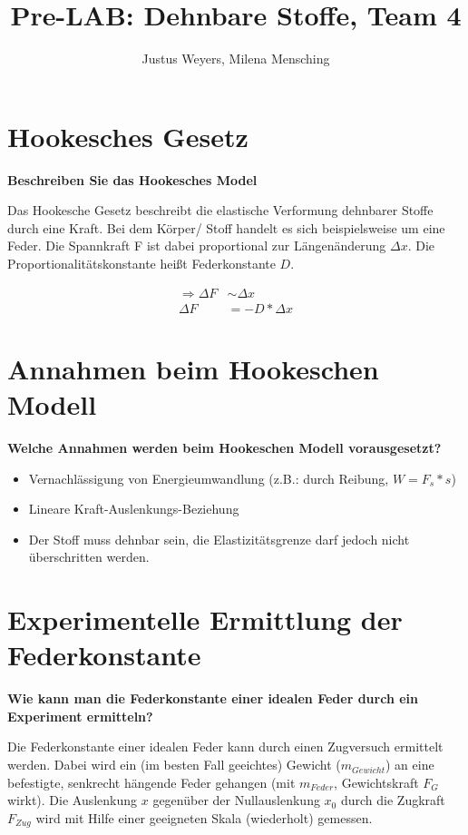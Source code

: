 \documentclass[a4paper, 12pt]{article}
\title{Pre-LAB: Dehnbare Stoffe, Team 4}
\author{Justus Weyers, Milena Mensching}
\begin{document}
\maketitle
\section{Hookesches Gesetz}
\textbf{Beschreiben Sie das Hookesches Model}

Das Hookesche Gesetz beschreibt die elastische Verformung dehnbarer Stoffe durch eine Kraft. Bei dem Körper/ Stoff handelt es sich beispielsweise um eine Feder. Die Spannkraft F ist dabei proportional zur Längenänderung $\Delta x$. Die Proportionalitätskonstante heißt Federkonstante $D$.

\begin{equation}
\begin{split}
\Rightarrow \Delta F&\sim\Delta x\\
\Delta F&= -D*\Delta x
\end{split}
\end{equation}


\section{Annahmen beim Hookeschen Modell}
\textbf{Welche Annahmen werden beim Hookeschen Modell vorausgesetzt?}

\begin{itemize}
\item{Vernachlässigung von Energieumwandlung (z.B.: durch Reibung, $W=F_s*s$)}
\item{Lineare Kraft-Auslenkungs-Beziehung}
\item{Der Stoff muss dehnbar sein, die Elastizitätsgrenze darf jedoch nicht überschritten werden.}
\end{itemize}

\section{Experimentelle Ermittlung der Federkonstante}
\textbf{Wie kann man die Federkonstante einer idealen Feder durch ein Experiment ermitteln?}

Die Federkonstante einer idealen Feder kann durch einen Zugversuch ermittelt werden. Dabei wird ein (im besten Fall geeichtes) Gewicht ($m_{Gewicht}$) an eine befestigte, senkrecht hängende Feder gehangen (mit $m_{Feder}$, Gewichtskraft $F_G$ wirkt). Die Auslenkung $x$ gegenüber der Nullauslenkung $x_0$ durch die Zugkraft $F_{Zug}$ wird mit Hilfe einer geeigneten Skala (wiederholt) gemessen.
\end{document}
